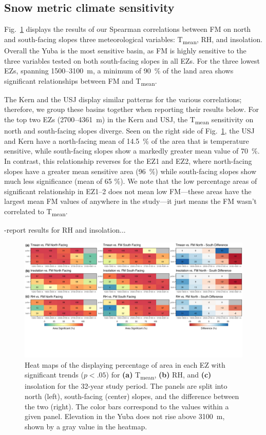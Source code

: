 \hypertarget{ch2-results-3}{\subsection{Snow metric climate sensitivity}\label{ch2-results-3}}

Fig.~\ref{fig:heat_map} displays the results of our Spearman correlations between FM on north and south-facing slopes three meteorological variables: T\textsubscript{mean}, RH, and insolation. Overall the Yuba is the most sensitive basin, as FM is highly sensitive to the three variables tested on both south-facing slopes in all EZs. For the three lowest EZs, spanning 1500--3100~m, a minimum of 90~\% of the land area shows significant relationships between FM and T\textsubscript{mean}. 

The Kern and the USJ display similar patterns for the various correlations; therefore, we group these basins together when reporting their results below. For the top two EZs (2700--4361~m) in the Kern and USJ, the T\textsubscript{mean} sensitivity on north and south-facing slopes diverge. Seen on the right side of Fig.~\ref{fig:heat_map}, the USJ and Kern have a north-facing mean of 14.5~\% of the area that is temperature sensitive, while south-facing slopes show a markedly greater mean value of 70~\%. In contrast, this relationship reverses for the EZ1 and EZ2, where north-facing slopes have a greater mean sensitive area (96~\%) while south-facing slopes show much less significance (mean of 65 \%). We note that the low percentage areas of significant relationship in EZ1--2 does not mean low FM---these areas have the largest mean FM values of anywhere in the study---it just means the FM wasn't correlated to T\textsubscript{mean}.

-report results for RH and insolation...


\begin{figure}[h]
\centering
\includegraphics[width=\textwidth]{figures/ch2_figs/metvars_fm_heatmaps_v4.png}
\caption{Heat maps of the displaying percentage of area in each EZ with significant trends ($p < .05$) for \textbf{(a)} T\textsubscript{mean}, \textbf{(b)} RH, and \textbf{(c)} insolation for the 32-year study period. The panels are split into north (left), south-facing (center) slopes, and the difference between the two (right). The color bars correspond to the values within a given panel. Elevation in the Yuba does not rise above 3100~m, shown by a gray value in the heatmap.}
\label{fig:heat_map}
\end{figure}



